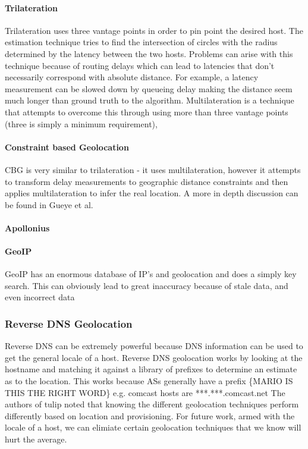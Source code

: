 \documentclass{acm_proc_article-sp}
\begin{document}
\paragraph{Trilateration}
Trilateration uses three vantage points in order to pin point the desired host. The estimation technique tries to find the intersection of 
circles with the radius determined by the latency between the two hosts. Problems can arise with this technique because of routing delays
which can lead to latencies that don't necessarily correspond with absolute distance. For example, a latency measurement can be slowed down by queueing delay
making the distance seem much longer than ground truth to the algorithm. Multilateration is a technique that attempts to overcome this through using more than three
vantage points (three is simply a minimum requirement), 
\paragraph{Constraint based Geolocation}
CBG is very similar to trilateration - it uses multilateration, however it attempts to transform delay measurements 
to geographic distance constraints and then applies multilateration to infer the real location. \cite{Gueye:2006}
A more in depth discussion can be found in Gueye et al. \cite{Gueye:2006}
\paragraph{Apollonius}
\paragraph{GeoIP}
GeoIP has an enormous database of IP's and geolocation and does a simply key search. This can obviously lead
to great inaccuracy because of stale data, and even incorrect data


\subsubsection{Reverse DNS Geolocation}
Reverse DNS can be extremely powerful because DNS information can be used to get the general locale of a host. \cite{Spring:2004}
Reverse DNS geolocation works by looking at the hostname and matching it against a library of prefixes to determine an estimate as to the 
location. This works because ASs generally have a prefix \{MARIO IS THIS THE RIGHT WORD\} e.g. comcast hosts are ***.***.comcast.net
The authors of tulip noted that knowing the different geolocation techniques perform differently based on location
and provisioning.\cite{TulipInfoComm} 
For future work, armed with the locale of a host, we can elimiate certain geolocation techniques that we know will hurt the average.
\end{document}
